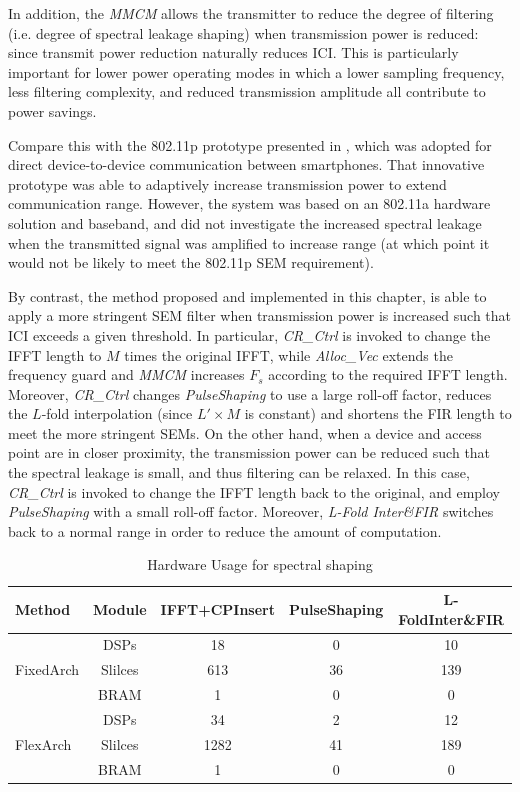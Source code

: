 In addition, the \emph{MMCM} allows the transmitter to reduce the degree of filtering (i.e. degree of spectral leakage shaping) when transmission power is reduced: since transmit power reduction naturally reduces ICI.
This is particularly important for lower power operating modes in which a lower sampling frequency, less filtering complexity, and reduced transmission amplitude all contribute to power savings.

Compare this with the 802.11p prototype presented in \cite{Choi2014}, which was adopted for direct device-to-device communication between smartphones.
That innovative prototype was able to adaptively increase transmission power to extend communication range.
However, the system was based on an 802.11a hardware solution and baseband, and did not investigate the increased spectral leakage when the transmitted signal was amplified to increase range (at which point it would not be likely to meet the 802.11p SEM requirement).

By contrast, the method proposed and implemented in this chapter, is able to apply a more stringent SEM filter when transmission power is increased such that ICI exceeds a given threshold.
In particular, \emph{CR\_Ctrl} is invoked to change the IFFT length to $M$ times the original IFFT, while \emph{Alloc\_Vec} extends the frequency guard and \emph{MMCM} increases $\mathit{F_s}$ according to the required IFFT length.
Moreover, \emph{CR\_Ctrl} changes \emph{PulseShaping} to use a large roll-off factor, reduces the $L$-fold interpolation (since $L'\times M$ is constant) and shortens the FIR length to meet the more stringent SEMs.
On the other hand, when a device and access point are in closer proximity, the transmission power can be reduced such that the spectral leakage is small, and thus filtering can be relaxed.
In this case, \emph{CR\_Ctrl} is invoked to change the IFFT length back to the original, and employ \emph{PulseShaping} with a small roll-off factor. Moreover, \emph{L-Fold Inter\&FIR} switches back to a normal range in order to reduce the amount of computation.

\begin{table}
	\centering
	\caption{Hardware Usage for spectral shaping}
	\label{tab:HardwareUsage}
	\renewcommand{\arraystretch}{1.5}
	\begin{tabular}{lcccc}
		\toprule
		Method		& Module	& IFFT+CPInsert  & PulseShaping  & L-FoldInter\&FIR \\
		\midrule	
		& DSPs		& 18	& 0		& 10	\\
		FixedArch		& Slilces	& 613	& 36	& 139	\\
		& BRAM		& 1	 	& 0		& 0 	\\	
		\midrule
		& DSPs		& 34	& 2		& 12	\\
		FlexArch		& Slilces	& 1282	& 41	& 189	\\
		& BRAM		& 1	 	& 0		& 0 	\\	
		
		\bottomrule
	\end{tabular}
\end{table} 

